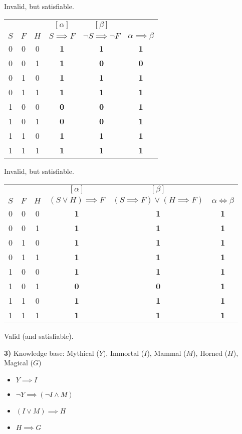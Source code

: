 \documentclass[11pt, oneside]{article}   	%
\begin{document}
Invalid, but satisfiable.

\begin{tabular}{ c | c | c | c | c | c}
& & & $[\alpha]$ & $[\beta]$ & \\
$S$ & $F$ & $H$ & $S \implies F$ & $\neg S \implies \neg F$ & $\alpha \implies \beta$ \\
\hline
0 & 0 & 0 & \textbf{1} & \textbf{1} & \textbf{1} \\
0 & 0 & 1 & \textbf{1} & \textbf{0} & \textbf{0} \\
0 & 1 & 0 & \textbf{1} & \textbf{1} & \textbf{1} \\
0 & 1 & 1 & \textbf{1} & \textbf{1} & \textbf{1} \\
1 & 0 & 0 & \textbf{0} & \textbf{0} & \textbf{1} \\
1 & 0 & 1 & \textbf{0} & \textbf{0} & \textbf{1} \\
1 & 1 & 0 & \textbf{1} & \textbf{1} & \textbf{1} \\
1 & 1 & 1 & \textbf{1} & \textbf{1} & \textbf{1} 
\end{tabular}

Invalid, but satisfiable.

\begin{tabular}{ c | c | c | c | c | c}
& & & $[\alpha]$ & $[\beta]$ & \\
$S$ & $F$ & $H$ & $(S \lor H) \implies F$ & $(S \implies F) \lor (H \implies F)$ & $\alpha \iff \beta$ \\
\hline
0 & 0 & 0 & \textbf{1} & \textbf{1} & \textbf{1} \\
0 & 0 & 1 & \textbf{1} & \textbf{1} & \textbf{1} \\
0 & 1 & 0 & \textbf{1} & \textbf{1} & \textbf{1} \\
0 & 1 & 1 & \textbf{1} & \textbf{1} & \textbf{1} \\
1 & 0 & 0 & \textbf{1} & \textbf{1} & \textbf{1} \\
1 & 0 & 1 & \textbf{0} & \textbf{0} & \textbf{1} \\
1 & 1 & 0 & \textbf{1} & \textbf{1} & \textbf{1} \\
1 & 1 & 1 & \textbf{1} & \textbf{1} & \textbf{1} 
\end{tabular}

Valid (and satisfiable).

\textbf{3)} Knowledge base: Mythical ($Y$), Immortal ($I$), Mammal ($M$), Horned ($H$), Magical ($G$)

\begin{itemize}
\item $Y \implies I$
\item $\neg Y \implies (\neg I \land M)$
\item $(I \lor M) \implies H$
\item $H \implies G$
\end{itemize}
\end{document}
